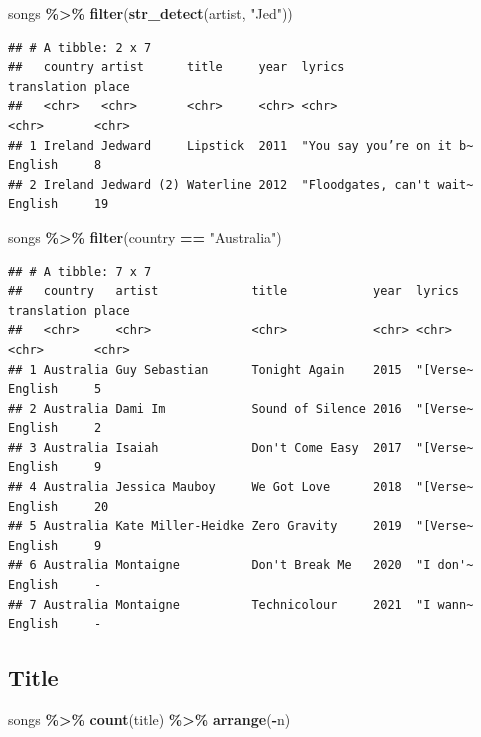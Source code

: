 \documentclass[
]{article}
\newenvironment{Shaded}{\begin{snugshade}}{\end{snugshade}}
\newcommand{\FunctionTok}[1]{\textcolor[rgb]{0.13,0.29,0.53}{\textbf{#1}}}
\newcommand{\NormalTok}[1]{#1}
\newcommand{\SpecialCharTok}[1]{\textcolor[rgb]{0.81,0.36,0.00}{\textbf{#1}}}
\newcommand{\StringTok}[1]{\textcolor[rgb]{0.31,0.60,0.02}{#1}}
\begin{document}
\begin{Shaded}
\begin{Highlighting}[]
\NormalTok{songs }\SpecialCharTok{\%\textgreater{}\%}
  \FunctionTok{filter}\NormalTok{(}\FunctionTok{str\_detect}\NormalTok{(artist, }\StringTok{"Jed"}\NormalTok{))}
\end{Highlighting}
\end{Shaded}

\begin{verbatim}
## # A tibble: 2 x 7
##   country artist      title     year  lyrics                   translation place
##   <chr>   <chr>       <chr>     <chr> <chr>                    <chr>       <chr>
## 1 Ireland Jedward     Lipstick  2011  "You say you’re on it b~ English     8    
## 2 Ireland Jedward (2) Waterline 2012  "Floodgates, can't wait~ English     19
\end{verbatim}

\begin{Shaded}
\begin{Highlighting}[]
\NormalTok{songs }\SpecialCharTok{\%\textgreater{}\%}
  \FunctionTok{filter}\NormalTok{(country }\SpecialCharTok{==} \StringTok{"Australia"}\NormalTok{)}
\end{Highlighting}
\end{Shaded}

\begin{verbatim}
## # A tibble: 7 x 7
##   country   artist             title            year  lyrics   translation place
##   <chr>     <chr>              <chr>            <chr> <chr>    <chr>       <chr>
## 1 Australia Guy Sebastian      Tonight Again    2015  "[Verse~ English     5    
## 2 Australia Dami Im            Sound of Silence 2016  "[Verse~ English     2    
## 3 Australia Isaiah             Don't Come Easy  2017  "[Verse~ English     9    
## 4 Australia Jessica Mauboy     We Got Love      2018  "[Verse~ English     20   
## 5 Australia Kate Miller-Heidke Zero Gravity     2019  "[Verse~ English     9    
## 6 Australia Montaigne          Don't Break Me   2020  "I don'~ English     -    
## 7 Australia Montaigne          Technicolour     2021  "I wann~ English     -
\end{verbatim}

\subsection{Title}\label{title}

\begin{Shaded}
\begin{Highlighting}[]
\NormalTok{songs }\SpecialCharTok{\%\textgreater{}\%}
  \FunctionTok{count}\NormalTok{(title) }\SpecialCharTok{\%\textgreater{}\%} 
  \FunctionTok{arrange}\NormalTok{(}\SpecialCharTok{{-}}\NormalTok{n)}
\end{Highlighting}
\end{Shaded}
\end{document}
